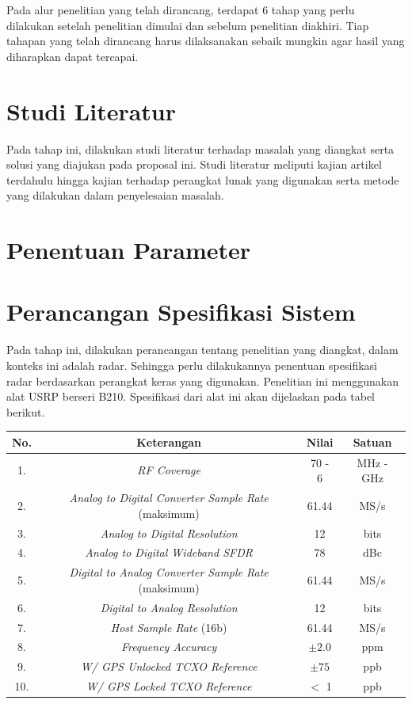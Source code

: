 Pada alur penelitian yang telah dirancang, terdapat 6 tahap yang perlu dilakukan setelah penelitian dimulai dan sebelum penelitian diakhiri. Tiap tahapan yang telah dirancang harus dilaksanakan sebaik mungkin agar hasil yang diharapkan dapat tercapai.

\section{Studi Literatur}
Pada tahap ini, dilakukan studi literatur terhadap masalah yang diangkat serta solusi yang diajukan pada proposal ini. Studi literatur meliputi kajian artikel terdahulu hingga kajian terhadap perangkat lunak yang digunakan serta metode yang dilakukan dalam penyelesaian masalah.
	
\section{Penentuan Parameter}


\section{Perancangan Spesifikasi Sistem}
Pada tahap ini, dilakukan perancangan tentang penelitian yang diangkat, dalam konteks ini adalah radar. Sehingga perlu dilakukannya penentuan spesifikasi radar berdasarkan perangkat keras yang digunakan. Penelitian ini menggunakan alat USRP berseri B210.  Spesifikasi dari alat ini akan dijelaskan pada tabel berikut.

\begin{longtable}{|c|c|c|c|}
	\hline
	No. & Keterangan & Nilai & Satuan \\
	\hline
	1. & \textit{RF Coverage} & 70 - 6 & MHz - GHz \\
	\hline
	2. & \textit{Analog to Digital Converter Sample Rate} (maksimum) & 61.44 & MS/s \\
	\hline
	3. & \textit{Analog to Digital Resolution}  & 12 & bits	\\
	\hline
	4. &\textit{Analog to Digital Wideband SFDR} & 78 & dBc \\
	\hline
	5. & \textit{Digital to Analog Converter Sample Rate} (maksimum) & 61.44 & MS/s \\
	\hline
	6. & \textit{Digital to Analog Resolution}  & 12 & bits	\\
	\hline
	7. & \textit{Host Sample Rate} (16b) & 61.44 & MS/s \\
	\hline
	8. & \textit{Frequency Accuracy} & $\pm 2.0$ & ppm \\
	\hline
	9. &  \textit{W/ GPS Unlocked TCXO Reference} & $\pm 75$ & ppb \\
	\hline
	10. & \textit{W/ GPS Locked TCXO Reference} & $<$ 1 & ppb \\ 
	\hline
\end{longtable}

